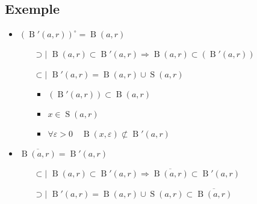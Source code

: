\documentclass{article}
\DeclareMathOperator{\bola}{B}
\DeclareMathOperator{\sfere}{S}
\begin{document}
\subsection*{Exemple}
\begin{itemize}
\item $(\bola'(a, r))^\circ = \bola(a, r)$
	\begin{itemize}
	\item[$\supset|$] $\bola(a,r) \subset \bola'(a,r) \Rightarrow \bola(a, r) \subset (\bola'(a, r))$
	\item[$\subset|$] $\bola'(a,r) = \bola(a,r) \cup \sfere(a,r)$
		\begin{itemize}
		\item $(\bola'(a, r)) \subset \bola (a, r)$
		\item $x \in \sfere(a, r)$
		\item $\forall \varepsilon > 0\quad \bola(x, \varepsilon) \not\subset \bola'(a, r)$
		\end{itemize}
	\end{itemize}

\item $\overline{\bola(a, r)} = \bola'(a,r)$
	\begin{itemize}
	\item[$\subset|$] $\bola(a,r) \subset \bola'(a,r) \Rightarrow \overline{\bola(a, r)} \subset \bola'(a,r)$
	\item[$\supset|$] $\bola'(a,r) = \bola(a,r) \cup \sfere(a,r) \subset \overline{\bola(a, r)}$
	\end{itemize}
\end{itemize}
\end{document}
